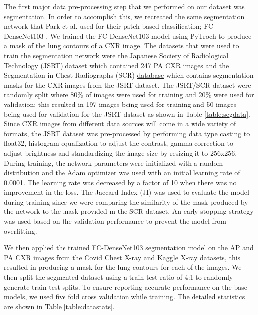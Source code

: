 \documentclass{sigkddExp}
\begin{document}
The first major data pre-processing step that we performed on our dataset was
segmentation. In order to accomplish this, we recreated the same segmentation
network that Park et al. used for their patch-based classification;
FC-DenseNet103 \cite{DBLP:journals/corr/JegouDVRB16}. We trained the
FC-DenseNet103 model using PyTroch to produce a mask of the lung contours of a
CXR image. The datasets that were used to train the segmentation network were
the Japanese Society of Radiological Technology (JSRT)
\href{http://db.jsrt.or.jp/eng.php}{dataset} which contained 247 PA CXR images
and the Segmentation in Chest Radiographs (SCR)
\href{https://www.isi.uu.nl/Research/Databases/SCR/}{database} which contains
segmentation masks for the CXR images from the JSRT dataset. The JSRT/SCR
dataset were randomly split where 80\% of images were used for training and 20\%
were used for validation; this resulted in 197 images being used for training
and 50 images being used for validation for the JSRT dataset as shown in Table
\ref{table:segdata}. Since CXR images from different data sources will come in a
wide variety of formats, the JSRT dataset was pre-processed by performing data
type casting to float32, histogram equalization to adjust the contrast, gamma
correction to adjust brightness and standardizing the image size by resizing it
to 256x256. During training, the network parameters were initialized with a
random distribution and the Adam optimizer was used with an initial learning
rate of 0.0001. The learning rate was decreased by a factor of 10 when there was
no improvement in the loss. The Jaccard Index (JI) was used to evaluate the
model during training since we were comparing the similarity of the mask
produced by the network to the mask provided in the SCR dataset. An early
stopping strategy was used based on the validation performance to prevent the
model from overfitting.

We then applied the trained FC-DenseNet103 segmentation model on the AP and PA
CXR images from the Covid Chest X-ray and Kaggle X-ray datasets, this resulted
in producing a mask for the lung contours for each of the images. We then split
the segmented dataset using a train-test ratio of 4:1 to randomly generate train
test splits. To ensure reporting accurate performance on the base models, we
used five fold cross validation while training. The detailed statistics are
shown in Table \ref{table:datastats}.
\end{document}
